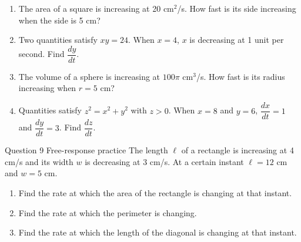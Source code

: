 \documentclass[11pt]{article}
\begin{document}
\begin{enumerate}[leftmargin=*,itemsep=2pt,start=5]
  \item The area of a square is increasing at 20 cm$^2$/s. How fast is its side increasing when the side is 5 cm?\work{2.8cm}
  \item Two quantities satisfy $xy=24$. When $x=4$, $x$ is decreasing at 1 unit per second. Find $\dfrac{dy}{dt}$.\work{2.8cm}
  \item The volume of a sphere is increasing at $100\pi$ cm$^3$/s. How fast is its radius increasing when $r=5$ cm?\work{2.8cm}
  \item Quantities satisfy $z^2=x^2+y^2$ with $z>0$. When $x=8$ and $y=6$, $\dfrac{dx}{dt}=1$ and $\dfrac{dy}{dt}=3$. Find $\dfrac{dz}{dt}$.\work{2.8cm}
\end{enumerate}

\begin{frbox}{Question 9 \textperiodcentered{} Free-response practice}
The length $\ell$ of a rectangle is increasing at 4 cm/s and its width $w$ is decreasing at 3 cm/s. At a certain instant $\ell=12$ cm and $w=5$ cm.
\begin{enumerate}[label=(\alph*),leftmargin=*,itemsep=2pt]
  \item Find the rate at which the area of the rectangle is changing at that instant.\work{2.6cm}
  \item Find the rate at which the perimeter is changing.\work{2.6cm}
  \item Find the rate at which the length of the diagonal is changing at that instant.\work{2.6cm}
\end{enumerate}
\end{frbox}
\end{document}
